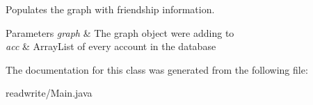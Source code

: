 Populates the graph with friendship information. 


\begin{DoxyParams}{Parameters}
{\em graph} & The graph object we\textquotesingle{}re adding to \\
\hline
{\em acc} & Array\+List of every account in the database \\
\hline
\end{DoxyParams}


The documentation for this class was generated from the following file\+:\begin{DoxyCompactItemize}
\item 
readwrite/Main.\+java\end{DoxyCompactItemize}
